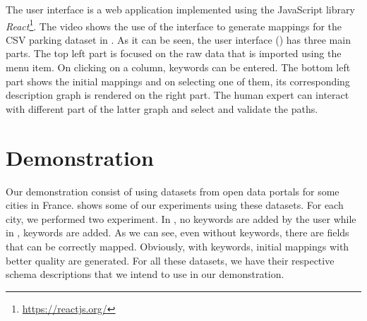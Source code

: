 The user interface is a web application implemented using the JavaScript library \emph{React}\footnote{\url{https://reactjs.org/}}. The video shows the use of the interface to generate mappings for the CSV parking dataset in . As it can be seen, the user interface () has three main parts. The top left part is focused on the raw data that is imported using the  menu item. On clicking on a column, keywords can be entered. The bottom left part shows the initial mappings and on selecting one of them, its corresponding description graph is rendered on the right part. The human expert can interact with different part of the latter graph and select and validate the paths. 

\section{Demonstration}\label{sec:demonstration}
Our demonstration consist of using datasets from open data portals for some cities in France.  shows some of our experiments using these datasets. For each city, we performed two experiment. In , no keywords are added by the user while in , keywords are added. As we can see, even without keywords, there are fields that can be correctly mapped. Obviously, with keywords, initial mappings with better quality are generated. For all these datasets, we have their respective schema descriptions that we intend to use in our demonstration. 



